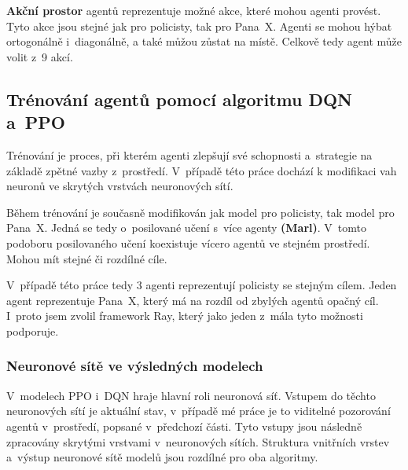\bigskip
\bigskip

\textbf{Akční prostor} agentů reprezentuje možné akce, které mohou agenti provést.
Tyto akce jsou stejné jak pro policisty, tak pro Pana~X\@.
Agenti se mohou hýbat ortogonálně i~diagonálně, a také můžou zůstat na místě.
Celkově tedy agent může volit z~9 akcí.

\subsection{Trénování agentů pomocí algoritmu DQN a~PPO}
Trénování je proces, při kterém agenti zlepšují své schopnosti a~strategie na základě zpětné vazby z~prostředí.
V~případě této práce dochází k modifikaci vah neuronů ve skrytých vrstvách neuronových sítí.

Během trénování je současně modifikován jak model pro policisty, tak model pro Pana~X\@.
Jedná se tedy o~posilované učení s~více agenty \textbf{(Marl)}.
V~tomto podoboru posilovaného učení koexistuje vícero agentů ve stejném prostředí.
Mohou mít stejné či rozdílné cíle.

V~případě této práce tedy 3 agenti reprezentují policisty se stejným cílem.
Jeden agent reprezentuje Pana~X, který má na rozdíl od zbylých agentů opačný cíl.
I~proto jsem zvolil framework Ray, který jako jeden z~mála tyto možnosti podporuje.

\subsubsection{Neuronové sítě ve výsledných modelech}
\label{subsec:neuronove_site}
V~modelech PPO i~DQN hraje hlavní roli neuronová síť.
Vstupem do těchto neuronových sítí je aktuální stav, v~případě mé práce je to viditelné pozorování agentů v~prostředí, popsané v~předchozí části.
Tyto vstupy jsou následně zpracovány skrytými vrstvami v~neuronových sítích.
Struktura vnitřních vrstev a~výstup neuronové sítě modelů jsou rozdílné pro oba algoritmy.
\bigskip


